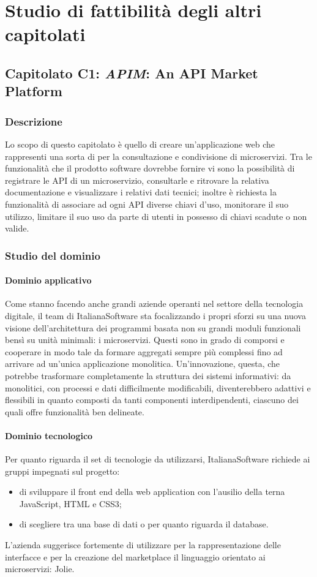 \newpage

\section{Studio di fattibilità degli altri capitolati}
	\subsection{Capitolato C1: \emph{APIM}: An API Market Platform}
		\subsubsection{Descrizione}
		Lo scopo di questo capitolato è quello di creare un'applicazione web che rappresenti una sorta di  per la consultazione e 
		condivisione di microservizi. Tra le funzionalità che il prodotto software dovrebbe fornire vi sono la possibilità di registrare le API 
		di un microservizio, consultarle e ritrovare la relativa documentazione e visualizzare i relativi dati tecnici; inoltre è richiesta la 
		funzionalità di associare ad ogni API diverse chiavi d'uso, monitorare il suo utilizzo, limitare il suo uso da parte di utenti in possesso 
		di chiavi scadute o non valide.
		\subsubsection{Studio del dominio}
			\paragraph{Dominio applicativo}
			Come stanno facendo anche grandi aziende operanti nel settore della tecnologia digitale, il team di ItalianaSoftware sta focalizzando i propri sforzi su una nuova visione dell'architettura dei programmi basata non su grandi moduli funzionali bensì su unità minimali: i microservizi. Questi sono in grado di comporsi e cooperare in modo tale da formare aggregati sempre più complessi fino ad arrivare ad un'unica applicazione monolitica. Un'innovazione, questa, che potrebbe trasformare completamente la struttura dei sistemi informativi: da monolitici, con processi e dati difficilmente modificabili, diventerebbero adattivi e flessibili in quanto composti da tanti componenti interdipendenti, ciascuno dei quali offre funzionalità ben delineate.
			\paragraph{Dominio tecnologico}
			Per quanto riguarda il set di tecnologie da utilizzarsi, ItalianaSoftware richiede ai gruppi impegnati sul progetto:
			\begin{itemize}
			\item di sviluppare il front end della web application con l'ausilio della terna JavaScript, HTML e CSS3;
			\item di scegliere tra una base di dati  o  per quanto riguarda il database.
			\end{itemize}
			L'azienda suggerisce fortemente di utilizzare per la rappresentazione delle interfacce e per la creazione del marketplace
			il linguaggio orientato ai microservizi: Jolie.
